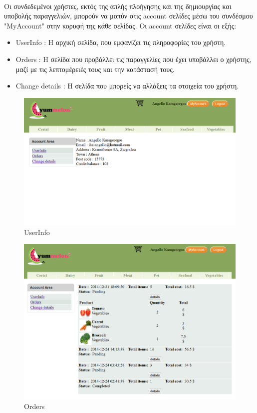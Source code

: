 \documentclass[12pt]{article}
\begin{document}
	  	 \paragraph{}
	  	 	Οι συνδεδεμένοι χρήστες, εκτός της απλής πλοήγησης και της δημιουργίας και υποβολής παραγγελιών, μπορούν να μοπύν στις account σελίδες μέσω του συνδέσμου "MyAccount" στην κορυφή της κάθε σελίδας. Οι account σελίδες είναι οι εξής:
	  	 	\begin{itemize}
	  	 	  \item UserInfo : Η αρχική σελίδα, που εμφανίζει τις πληροφορίες του χρήστη.
	  	 	  \item Orders : Η σελίδα που προβάλλει τις παραγγελίες που έχει υποβάλλει ο χρήστης, μαζί με τις λεπτομέρειές τους και την κατάστασή τους.
	  	 	  \item Change details : Η σελίδα που μπορείς να αλλάξεις τα στοιχεία του χρήστη.
	  	 	\end{itemize}
			\begin{figure}[H]
				\centering
				\includegraphics[width=1\textwidth]{userInfo}
				\caption{UserInfo}
			\end{figure}
			\begin{figure}[H]
				\centering
				\includegraphics[width=1\textwidth]{userOrders}
				\caption{Orders}
			\end{figure}
\end{document}
